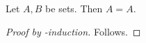 \begin{proposition}\label{phase5_ambiguous_set_induction}
    Let $A,B$ be sets.
    Then $A=A$.
\end{proposition}
\begin{proof}[Proof by \in-induction]
    Follows.
\end{proof}
